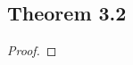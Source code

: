 \documentclass[../../main.tex]{subfiles}
\begin{document}
\subsection{Theorem 3.2}
\begin{wts}

\end{wts}
\begin{proof}

\end{proof}
\end{document}
